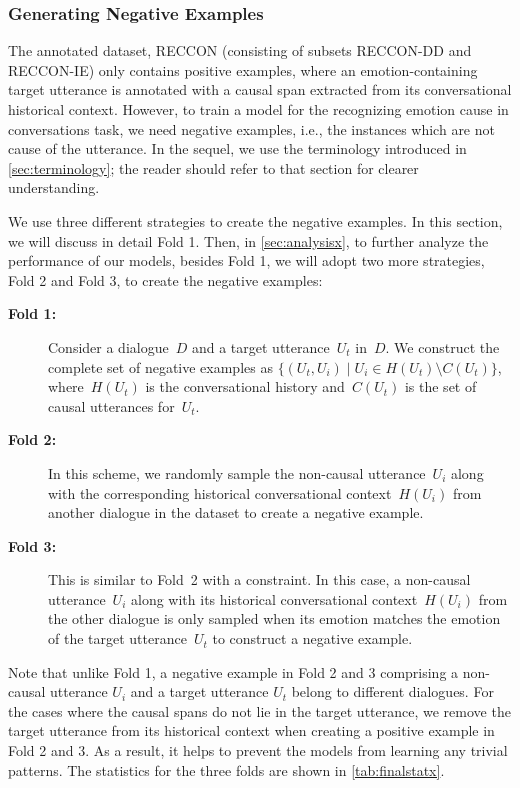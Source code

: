 \documentclass[smallextended]{svjour3}
\newcommand\RECCON{recognizing emotion cause in conversations} \newcommand\ECRIC{ECRIC}
\newcommand\RECCONDA{RECCON}
\newcommand\RECCONDADD{RECCON-DD}
\newcommand\RECCONDAIE{RECCON-IE}
\newcommand\0{\hphantom{0}}
\begin{document}
\subsubsection{Generating Negative Examples}
\label{sec:neg}
The annotated dataset, \RECCONDA{} (consisting of subsets \RECCONDADD{} and \RECCONDAIE{}) only contains positive examples, where an emotion-containing target utterance is annotated with a causal span extracted from its conversational historical context. However, to train a model for the \RECCON{} task, we need negative examples, i.e., the instances which are not cause of the utterance. In the sequel, we use the terminology introduced in \cref{sec:terminology}; the reader should 
refer to that section for clearer understanding.

We use three different strategies to create the negative examples.
In this section, we will discuss in detail Fold 1. Then, in \cref{sec:analysisx}, to further analyze the performance of our models, besides Fold 1, we will adopt two more strategies, Fold 2 and Fold 3, to create the negative examples:
\begin{description}
\item[\textbf{Fold 1:}] Consider a dialogue~$D$ and a target utterance~$U_t$ in~$D$.
We construct the complete set of negative examples as 
$\{(U_t, U_i) \mid U_i \in H(U_t) \setminus C(U_t) \}$,
where~$H(U_t)$ is the conversational history and~$C(U_t)$ is the set of causal utterances for~$U_t$.
\item[\textbf{Fold 2:}] In this scheme, we randomly sample the non-causal utterance~$U_i$ along with the corresponding historical conversational context~$H(U_i)$ from another dialogue in the dataset to create a negative example.
\item[\textbf{Fold 3:}] This is similar to Fold~2 with a constraint. In this case, a non-causal utterance~$U_i$ along with its historical conversational context~$H(U_i)$ from the other dialogue is only sampled when its emotion matches the emotion of the target utterance~$U_t$ to construct a negative example.
\end{description}
Note that unlike Fold 1, a negative example in Fold 2 and 3 comprising a non-causal utterance $U_i$ and a target utterance $U_t$ belong to different dialogues. For the cases where the causal spans do not lie in the target utterance, we remove the target utterance from its historical context when creating a positive example in Fold 2 and 3. As a result, it helps to prevent the models from learning any trivial patterns. The statistics for the three folds are shown in \cref{tab:finalstatx}.
\end{document}
